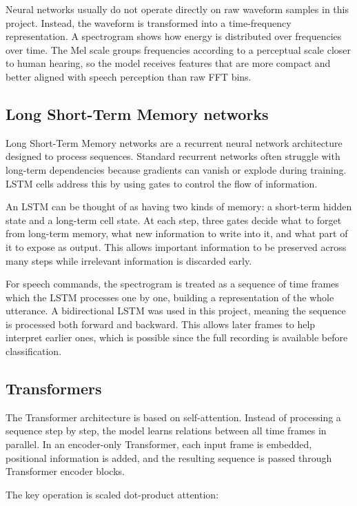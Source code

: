 \documentclass[14pt]{article}
\begin{document}
Neural networks usually do not operate directly on raw waveform samples in this project. Instead, the waveform is transformed into a time-frequency representation. A spectrogram shows how energy is distributed over frequencies over time. The Mel scale groups frequencies according to a perceptual scale closer to human hearing, so the model receives features that are more compact and better aligned with speech perception than raw FFT bins.

\subsection{Long Short-Term Memory networks}

Long Short-Term Memory networks are a recurrent neural network architecture designed to process sequences. Standard recurrent networks often struggle with long-term dependencies because gradients can vanish or explode during training. LSTM cells address this by using gates to control the flow of information.

An LSTM can be thought of as having two kinds of memory: a short-term hidden state and a long-term cell state. At each step, three gates decide what to forget from long-term memory, what new information to write into it, and what part of it to expose as output. This allows important information to be preserved across many steps while irrelevant information is discarded early.

For speech commands, the spectrogram is treated as a sequence of time frames which the LSTM processes one by one, building a representation of the whole utterance. A bidirectional LSTM was used in this project, meaning the sequence is processed both forward and backward. This allows later frames to help interpret earlier ones, which is possible since the full recording is available before classification.

\subsection{Transformers}

The Transformer architecture is based on self-attention. Instead of processing a sequence step by step, the model learns relations between all time frames in parallel. In an encoder-only Transformer, each input frame is embedded, positional information is added, and the resulting sequence is passed through Transformer encoder blocks.

The key operation is scaled dot-product attention:
\end{document}
